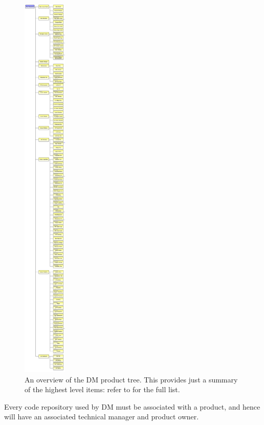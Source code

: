 \begin{figure}[htbp]
	\begin{center}
		 \includegraphics[height=19cm]{ProductTree}
         \caption{An overview of the DM product tree. This provides just a summary of the highest level items: refer to  for the full list.}
         \label{fig:prods}
	 \end{center}
 \end{figure}

Every code repository used by DM must be associated with a product, and hence will have an associated technical manager and product owner.
